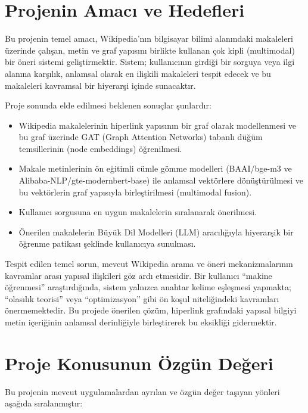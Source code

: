 \section{Projenin Amacı ve Hedefleri}

Bu projenin temel amacı, Wikipedia'nın bilgisayar bilimi alanındaki makaleleri üzerinde çalışan, metin ve graf yapısını birlikte kullanan çok kipli (multimodal) bir öneri sistemi geliştirmektir. Sistem; kullanıcının girdiği bir sorguya veya ilgi alanına karşılık, anlamsal olarak en ilişkili makaleleri tespit edecek ve bu makaleleri kavramsal bir hiyerarşi içinde sunacaktır.

Proje sonunda elde edilmesi beklenen sonuçlar şunlardır:

\begin{itemize}
    \item Wikipedia makalelerinin hiperlink yapısının bir graf olarak modellenmesi ve bu graf üzerinde GAT (Graph Attention Networks) tabanlı düğüm temsillerinin (node embeddings) öğrenilmesi.
    \item Makale metinlerinin ön eğitimli cümle gömme modelleri (BAAI/bge-m3 ve Alibaba-NLP/gte-modernbert-base) ile anlamsal vektörlere dönüştürülmesi ve bu vektörlerin graf yapısıyla birleştirilmesi (multimodal fusion).
    \item Kullanıcı sorgusuna en uygun makalelerin sıralanarak önerilmesi.
    \item Önerilen makalelerin Büyük Dil Modelleri (LLM) aracılığıyla hiyerarşik bir öğrenme patikası şeklinde kullanıcıya sunulması.
\end{itemize}

Tespit edilen temel sorun, mevcut Wikipedia arama ve öneri mekanizmalarının kavramlar arası yapısal ilişkileri göz ardı etmesidir. Bir kullanıcı ``makine öğrenmesi'' araştırdığında, sistem yalnızca anahtar kelime eşleşmesi yapmakta; ``olasılık teorisi'' veya ``optimizasyon'' gibi ön koşul niteliğindeki kavramları önermemektedir. Bu projede önerilen çözüm, hiperlink grafındaki yapısal bilgiyi metin içeriğinin anlamsal derinliğiyle birleştirerek bu eksikliği gidermektir.

\section{Proje Konusunun Özgün Değeri}

Bu projenin mevcut uygulamalardan ayrılan ve özgün değer taşıyan yönleri aşağıda sıralanmıştır:

